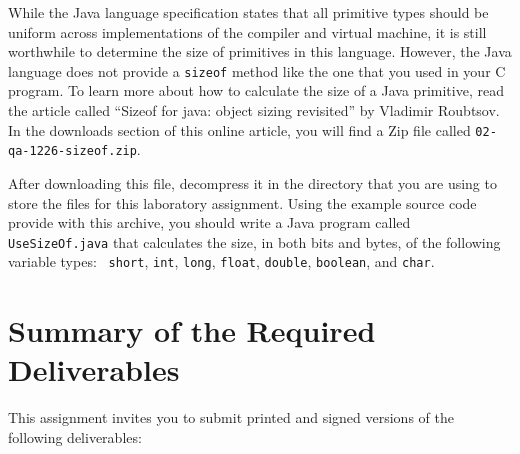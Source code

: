   While the Java language specification states that all primitive types should be uniform across implementations of the
  compiler and virtual machine, it is still worthwhile to determine the size of primitives in this language. However,
  the Java language does not provide a {\tt sizeof} method like the one that you used in your C program. To learn more
  about how to calculate the size of a Java primitive, read the article called ``Sizeof for java: object sizing
  revisited'' by Vladimir Roubtsov. In the downloads section of this online article, you will find a Zip file called
  {\tt 02-qa-1226-sizeof.zip}. 
  
  After downloading this file, decompress it in the directory that you are using to store the files for this laboratory
  assignment. Using the example source code provide with this archive, you should write a Java program called {\tt
  UseSizeOf.java} that calculates the size, in both bits and bytes, of the following variable types:  {\tt
  short}, {\tt int}, {\tt long}, {\tt float}, {\tt double}, {\tt boolean}, and {\tt char}.

\section*{Summary of the Required Deliverables}

This assignment invites you to submit printed and signed versions of the following deliverables: 

